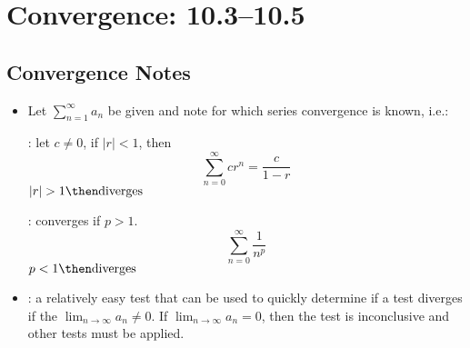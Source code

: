 \chapter{Convergence: 10.3--10.5}
\section{Convergence Notes}
\begin{itemize}

  \item Let \(\displaystyle \sum_{n=1}^{\infty} a_n\) be given and note for
    which series convergence is known, i.e.:

    \vspace{10pt}

    \begin{multicols}{2}
      : let \(c \neq 0\), if \(|r| < 1\), then
      \[%
        \sum_{n=0}^{\infty} cr^n = \frac{c}{1-r}
      \]%
      \(|r| > 1 \then \text{diverges}\)

      : converges if \(p > 1\).
      \[%
        \sum_{n=0}^{\infty} \frac{1}{n^p}
      \]%
      \(p < 1 \then \text{diverges}\)
    \end{multicols}

  \item {}: a relatively easy
    test that can be used to quickly determine if a test diverges if the
    \(\lim_{n \to \infty} a_n \neq 0 \). If \(\lim_{n \to \infty} a_n = 0\),
    then the test is inconclusive and other tests must be applied.

\end{itemize}


